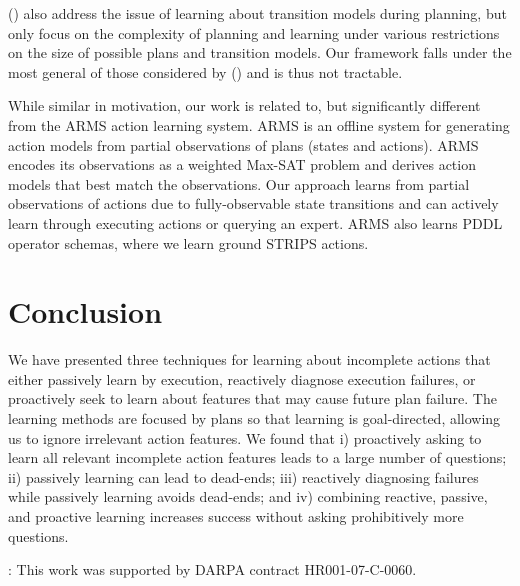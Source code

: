 \documentclass[letterpaper]{article}
\def\und#1{\noindent{\bf #1}:}
\def\citep#1{\cite{#1}}
\def\citet#1{\citeauthor{#1} (\citeyear{#1})}
\begin{document}
\citet{Safra94onplanning} also address the issue of learning about transition
models during planning, but only focus on the complexity of planning and
learning under various restrictions on the size of possible plans and transition
models.  Our framework falls under the most general of those considered by
\citet{Safra94onplanning} and is thus not tractable.  

While similar in motivation, our work is related to, but significantly different
from the ARMS \citep{arms} action learning system.  ARMS is an offline system
for generating action models from partial observations of plans (states and
actions).  ARMS encodes its observations as a weighted Max-SAT problem and
derives action models that best match the observations.  Our approach learns
from partial observations of actions due to fully-observable state transitions
and can actively learn through executing actions or querying an expert.  ARMS
also learns PDDL operator schemas, where we learn ground STRIPS actions.

 
\section{Conclusion}

We have presented three techniques for learning about incomplete actions that
either passively learn by execution, reactively diagnose execution failures, or
proactively seek to learn about features that may cause future plan failure. 
The learning methods are focused by plans so that learning is goal-directed,
allowing us to ignore irrelevant action features.  We found that i) proactively
asking to learn all relevant incomplete action features leads to a large number
of questions; ii) passively learning can lead to dead-ends; iii) reactively
diagnosing failures while passively learning avoids dead-ends; and iv) combining
reactive, passive, and proactive learning increases success without asking
prohibitively more questions.



\smallskip

\und{Acknowledgements} This work was supported by DARPA contract HR001-07-C-0060.




\end{document}
